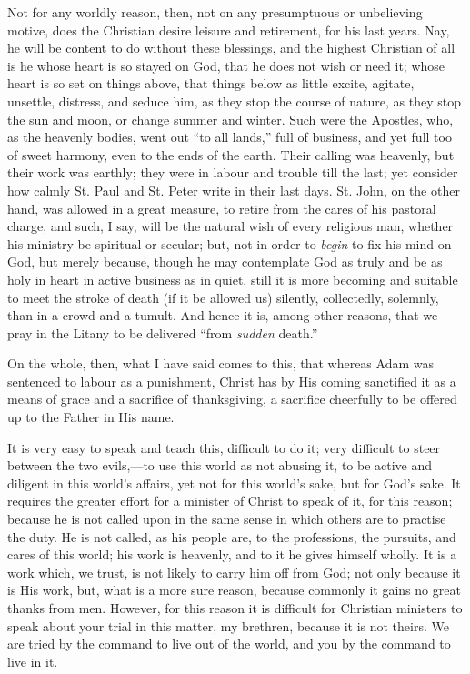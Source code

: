 Not for any worldly reason, then, not on any presumptuous or
unbelieving motive, does the Christian desire leisure and retirement,
for his last years. Nay, he will be content to do without these
blessings, and the highest Christian of all is he whose heart is so
stayed on God, that he does not wish or need it; whose heart is so set
on things above, that things below as little excite, agitate,
unsettle, distress, and seduce him, as they stop the course of nature,
as they stop the sun and moon, or change summer and winter. Such were
the Apostles, who, as the heavenly bodies, went out ``to all
lands,'' full of business, and yet full too of sweet harmony, even
to the ends of the earth. Their calling was heavenly, but their work
was earthly; they were in labour and trouble till the last; yet
consider how calmly St. Paul and St. Peter write in their last days.
St. John, on the other hand, was allowed in a great measure, to retire
from the cares of his pastoral charge, and such, I say, will be the
natural wish of every religious man, whether his ministry be spiritual
or secular; but, not in order to \emph{begin} to fix his mind on God,
but merely because, though he may contemplate God as truly and be as
holy in heart in active business as in quiet, still it is more
becoming and suitable to meet the stroke of death (if it be allowed
us) silently, collectedly, solemnly, than in a crowd and a tumult. And
hence it is, among other reasons, that we pray in the Litany to be
delivered ``from \emph{sudden} death.''

On the whole, then, what I have said comes to this, that whereas
Adam was sentenced to labour as a punishment, Christ has by His coming
sanctified it as a means of grace and a sacrifice of thanksgiving, a
sacrifice cheerfully to be offered up to the Father in His name.

It is very easy to speak and teach this, difficult to do it; very
difficult to steer between the two evils,—to use this world as not
abusing it, to be active and diligent in this world's affairs, yet not
for this world's sake, but for God's sake. It requires the greater
effort for a minister of Christ to speak of it, for this reason;
because he is not called upon in the same sense in which others are to
practise the duty. He is not called, as his people are, to the
professions, the pursuits, and cares of this world; his work is
heavenly, and to it he gives himself wholly. It is a work which, we
trust, is not likely to carry him off from God; not only because it is
His work, but, what is a more sure reason, because commonly it gains
no great thanks from men. However, for this reason it is difficult for
Christian ministers to speak about your trial in this matter, my
brethren, because it is not theirs. We are tried by the command to
live out of the world, and you by the command to live in it.

